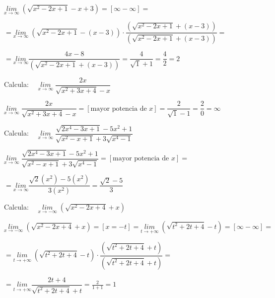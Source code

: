 	\begin{proofw}\renewcommand{\qedsymbol}{$\diamond$}

	 $\underset {x \to \infty}{lim}\; {(\sqrt{x^2-2x+1}-x+3)}=[\infty - \infty]=$
	 
	 $=\underset {x \to \infty}{lim}\; {(\sqrt{x^2-2x+1}-(x-3))}\cdot \dfrac{(\sqrt{x^2-2x+1}+(x-3))}{(\sqrt{x^2-2x+1}+(x-3))}=$
	 
	 $=\underset{x\to \infty}{lim}{\dfrac {4x-8}{(\sqrt{x^2-2x+1}+(x-3))}}=\dfrac {4}{\sqrt{1}+1}=\dfrac 4 2=2$
	\end{proofw}
	
	\begin{ejre} Calcula: $\quad \underset {x \to\infty }{lim}\; {\dfrac {2x}{\sqrt{x^2+3x+4}-x}}$
		
	\end{ejre}
	
	\begin{proofw}\renewcommand{\qedsymbol}{$\diamond$}

	$\underset {x \to\infty }{lim}\; {\dfrac {2x}{\sqrt{x^2+3x+4}-x}}=[\mbox{mayor potencia de }x]=\dfrac {2}{\sqrt{1}-1}=\dfrac 2 0=\infty$
	\end{proofw}
	
	\begin{ejre}Calcula: $\quad \underset {x \to \infty}{lim}\; {\dfrac {\sqrt{2x^4-3x+1}-5x^2+1}{\sqrt {x^2-x+1}+3\sqrt{x^4-1}}}$
		
	\end{ejre}
	
	\begin{proofw}\renewcommand{\qedsymbol}{$\diamond$}

	$\underset {x \to \infty}{lim}\; {\dfrac {\sqrt{2x^4-3x+1}-5x^2+1}{\sqrt {x^2-x+1}+3\sqrt{x^4-1}}}=[\mbox{mayor potencia de }x]=$
	
	$=\underset {x\to \infty}{lim}{\dfrac {\sqrt{2}(x^2)-5(x^2)} {3(x^2)}}=\dfrac {\sqrt{2}-5}{3}$
	\end{proofw}
	
	
	\begin{ejre}Calcula: $\quad \underset{x \to  -\infty}{lim}\; {(\sqrt{
	x^2-2x+4}+x)}$
		
	\end{ejre}
	
	\begin{proofw}\renewcommand{\qedsymbol}{$\diamond$}

	$\underset{x \to  -\infty}{lim}\; {(\sqrt
	{x^2-2x+4}+x)}=[x=-t]=\underset{t \to  +\infty}{lim}\; {(\sqrt
	{t^2+2t+4}-t)}=[\infty- \infty]=$
	
	$=\underset{t \to  +\infty}{lim}\; {(\sqrt
	{t^2+2t+4}-t)}\cdot \dfrac {(\sqrt
	{t^2+2t+4}+t)}{(\sqrt
	{t^2+2t+4}+t)}=$
	
	$=\underset {t\to +\infty}{lim}{\dfrac {2t+4}{\sqrt{t^2+2t+4}+t}}=\frac {2}{1+1}=1$
	\end{proofw}
	
